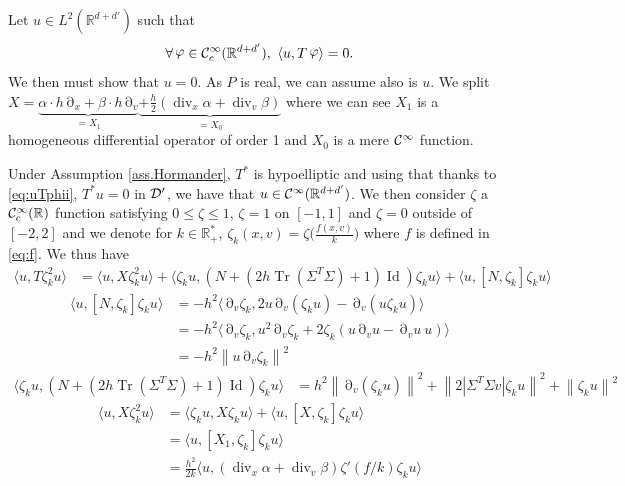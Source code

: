 \documentclass[12pt]{amsart}
\newcommand{\Id}{\operatorname{Id}}
\newcommand{\R}{\mathbb R}
\newcommand{\Tr}{{\operatorname{Tr}}}
\renewcommand{\div}{\operatorname{div}}
\def\<{\langle}
\def\>{\rangle}
\numberwithin{equation}{section}
\numberwithin{figure}{section}
\DeclareMathOperator{\p}{\partial}
\DeclareMathOperator{\phii}{\varphi}
\newcommand{\vvert}[1]{\left\lVert#1\right\rVert}
\begin{document}
Let $u\in L^2(\R^{d+d'})$ such that
\begin{equation}\label{eq:uTphii}
\forall \phii\in\ccc_c^\infty(\R^{d+d'}),\ \< u,T\phii\> =0.
\end{equation}
We then must show that $u=0$. As $P$ is real, we can assume also is $u$. We split $X= \underbrace{\alpha\cdot h\p_x + \beta\cdot h\p_v}_{=X_1}\underbrace{+\frac h2(\div_x\alpha+\div_v\beta)}_{=X_0}$ where we can see $X_1$ is a homogeneous differential operator of order 1 and $X_0$ is a mere ${\mathcal C}^\infty$ function.

Under Assumption \ref{ass.Hormander}, $T^*$ is hypoelliptic and using that thanks to \eqref{eq:uTphii}, $T^*u=0$ in ${\mathcal D}'$, we have that $u\in\ccc^\infty(\R^{d+d'})$. We then consider $\zeta$ a $\ccc^\infty_c(\R)$ function satisfying $0\leq\zeta\leq1$, $\zeta = 1$ on $[-1,1]$ and $\zeta=0$ outside of $[-2,2]$ and we denote for $k\in\R_+^*$, $\zeta_k(x,v) = \zeta\Big(\frac{f(x,v)}{k}\Big)$ where $f$ is defined in \eqref{eq:f}. We thus have
\begin{equation*}
\begin{split}
    \<u,T\zeta_k^2 u\> &= \<u,X\zeta_k^2 u\> + \<\zeta_k u,(N+(2h\Tr(\Sigma^T\Sigma)+1)\Id)\zeta_k u\> + \<u, [N,\zeta_k]\zeta_k u\>
\end{split}
\end{equation*}
\begin{equation*}
\begin{split}
    \<u, [N,\zeta_k]\zeta_k u\> &= -h^2\<\p_v\zeta_k,2u\p_v(\zeta_k u)-\p_v(u\zeta_k u)\>\\
    &= -h^2\<\p_v\zeta_k,u^2\p_v\zeta_k+2\zeta_k(u\p_v u-\p_vu\ u)\>\\
    &= -h^2\vvert{u\p_v\zeta_k}^2
\end{split}
\end{equation*}
\begin{equation*}
\begin{split}
    \<\zeta_k u,(N+(2h\Tr(\Sigma^T\Sigma)+1)\Id)\zeta_k u\> &= h^2\vvert{\p_v(\zeta_k u)}^2 + \vvert{2|\Sigma^T\Sigma v|\zeta_k u}^2 + \vvert{\zeta_k u}^2
\end{split}
\end{equation*}
\begin{equation*}
\begin{split}
    \<u,X\zeta_k^2 u\> &= \<\zeta_k u,X\zeta_k u\> + \<u,[X,\zeta_k]\zeta_k u\>\\
    &= \<u,[X_1,\zeta_k]\zeta_k u\>\\
    &= \frac{h^2}{2k}\<u,(\div_x\alpha + \div_v\beta)\zeta'(f/k)\zeta_k u\>
\end{split}
\end{equation*}
\end{document}
